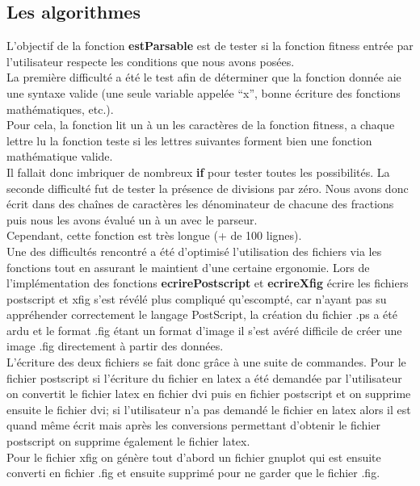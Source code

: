 \documentclass[a4paper,11pt]{article}
\begin{document}
		\subsection{Les algorithmes }
			L’objectif de la fonction \textbf{estParsable} est de tester si la fonction fitness entrée par l’utilisateur respecte les conditions que nous avons posées.\\
			La première difficulté a été le test afin de déterminer que la fonction donnée aie une syntaxe valide (une seule variable appelée “x”, bonne écriture des fonctions mathématiques, etc.).\\
			Pour cela, la fonction lit  un à un les caractères de la fonction fitness, a chaque lettre lu la fonction teste si les lettres suivantes forment bien une fonction mathématique valide. \\
			Il fallait donc imbriquer de nombreux \textbf{if} pour tester toutes les possibilités. La seconde difficulté fut de tester la présence de divisions par zéro. Nous avons donc écrit dans des chaînes de caractères les dénominateur de chacune des fractions puis nous les avons évalué un à un avec le parseur.\\
			Cependant, cette fonction est très longue (+ de 100 lignes).\\
			
			Une des difficultés rencontré a été d'optimisé l'utilisation des fichiers via les fonctions tout en assurant le maintient d'une certaine ergonomie.
			Lors de l'implémentation des fonctions \textbf{ecrirePostscript} et  \textbf{ecrireXfig} écrire les fichiers postscript et xfig s’est révélé plus compliqué qu’escompté, car n’ayant pas su appréhender correctement le langage PostScript, la création du fichier .ps a été ardu et le format .fig étant un format d’image il s’est avéré difficile de créer une image .fig directement à partir des données.\\
			L’écriture des deux fichiers se fait donc grâce à une suite de commandes. Pour le fichier postscript si l'écriture du fichier en latex a été demandée par l’utilisateur on convertit le fichier latex en fichier dvi puis en fichier postscript et on supprime ensuite le fichier dvi; si l'utilisateur n’a pas demandé le fichier en latex alors il est quand même écrit mais après les conversions permettant d’obtenir le fichier postscript on supprime également le fichier latex.\\
			Pour le fichier xfig on génère tout d’abord un fichier gnuplot qui est ensuite converti en fichier .fig et ensuite supprimé pour ne garder que le fichier .fig.\\
\end{document}
